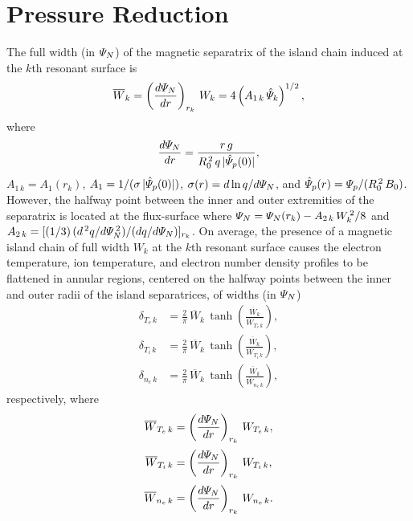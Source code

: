 \documentclass[notitlepage,12pt]{article}
\begin{document}
\section{Pressure Reduction} \label{a5}
The full width (in ${\mit\Psi}_N$)  of the magnetic separatrix of the island chain induced at the $k$th resonant surface is
\begin{equation}
\overline{W}_k = \left(\frac{d{\mit\Psi}_N}{dr}\right)_{r_k}\,W_k=4\left(A_{1\,k}\,\hat{\mit\Psi}_k\right)^{1/2},
\end{equation}
where 
\begin{equation}
\frac{d{\mit\Psi}_N}{dr} = \frac{r\,g}{R_0^{\,2}\,q\,|\hat{\mit\Psi}_p(0)|},
\end{equation}
$A_{1\,k}=A_1(r_k)$, $A_1 = 1/(\sigma\,|\hat{\mit\Psi}_p(0)|)$,  $\sigma(r) = d\ln q/d{\mit\Psi}_N$, and $\hat{\mit\Psi}_p(r) = {\mit\Psi}_p/(R_0^{\,2}\,B_0)$.  
However, the halfway point between the inner and outer extremities of the separatrix is located at the flux-surface where ${\mit\Psi}_N = {\mit\Psi}_N(r_k) - A_{2\,k}\,W_k^{\,2}/8$ and $A_{2\,k} = [(1/3)\,(d^{\,2}q/d{\mit\Psi}_N^{\,2})/(dq/d{\mit\Psi}_N)]_{r_k}$.
On average, the presence of a magnetic island chain of full width $W_k$ at the $k$th resonant surface
causes the electron temperature, ion temperature,  and electron number density profiles to be flattened in  annular regions, centered on the
halfway points between the inner and outer radii of the island separatrices, of widths (in ${\mit\Psi}_N$)
\begin{align}
\delta_{T_e\,k}& = \frac{2}{\pi}\,\overline{W}_k\,\tanh\left(\frac{\overline{W}_k}{\overline{W}_{T_e\,k}}\right),\\[0.5ex]
\delta_{T_i\,k}& = \frac{2}{\pi}\,\overline{W}_k\,\tanh\left(\frac{\overline{W}_k}{\overline{W}_{T_i\,k}}\right),\\[0.5ex]
\delta_{n_e\,k}& = \frac{2}{\pi}\,\overline{W}_k\,\tanh\left(\frac{\overline{W}_k}{\overline{W}_{n_e\,k}}\right),
\end{align}
respectively, where
\begin{align}
\overline{W}_{T_e\,k} &=  \left(\frac{d{\mit\Psi}_N}{dr}\right)_{r_k}\,W_{T_e\,k},\\[0.5ex]
\overline{W}_{T_i\,k} &= \left(\frac{d{\mit\Psi}_N}{dr}\right)_{r_k}\,W_{T_i\,k},\\[0.5ex]
\overline{W}_{n_e\,k} &= \left(\frac{d{\mit\Psi}_N}{dr}\right)_{r_k}\,W_{n_e\,k}.
\end{align}
\end{document}
